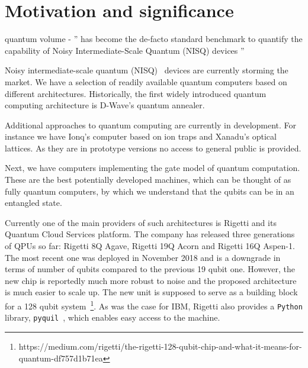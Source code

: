 \documentclass[preprint,12pt, a4paper]{elsarticle}
\newcommand{\1}{{\rm 1\hspace{-0.9mm}l}}
\begin{document}
\section{Motivation and significance}






quantum volume - '' has become the de-facto standard benchmark to quantify the capability of Noisy Intermediate-Scale Quantum (NISQ) devices '' \cite{pelofske2022volume}





Noisy intermediate-scale quantum
(NISQ)~\cite{preskill} devices are currently storming the market. We
have a selection of readily available quantum computers based on different
architectures. Historically, the first widely introduced quantum computing
architecture is D-Wave's quantum annealer. 



Additional approaches to quantum computing are currently in development. For 
instance we have Ionq's computer based on ion traps and Xanadu's optical 
lattices. As they are in prototype versions no access to general public is 
provided. 

Next, we have computers implementing the gate model of quantum computation.
These are the best potentially developed machines, which can be thought
of as fully quantum computers, by which we understand that the qubits can be in
an entangled state. 

Currently one of the main providers of such architectures is Rigetti and its 
Quantum Cloud Services platform. The company has
released three generations of QPUs so far: Rigetti 8Q Agave, Rigetti 19Q Acorn
and Rigetti 16Q Aspen-1. The most recent one was deployed in November 2018 and
is a downgrade in terms of number of qubits compared to the previous 19 qubit
one. However, the new chip is reportedly much more robust to noise and the
proposed architecture is much easier to scale up. The new unit is supposed to
serve as a building block for a 128 qubit
system~\footnote{https://medium.com/rigetti/the-rigetti-128-qubit-chip-and-what-it-means-for-quantum-df757d1b71ea}.
As was the case for IBM, Rigetti also provides a \texttt{Python} library, 
\texttt{pyquil}~\cite{}, which enables easy access to the machine.

\end{document}
